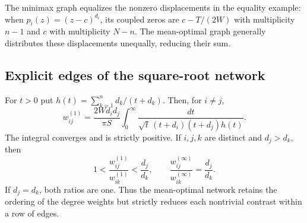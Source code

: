 The minimax graph equalizes the nonzero displacements in the equality
example: when $p_i(z)=(z-c)^{d_i}$, its coupled zeros are $c-T/(2W)$
with multiplicity $n-1$ and $c$ with multiplicity $N-n$. The mean-optimal
graph generally distributes these displacements unequally, reducing their
sum.

\subsection{Explicit edges of the square-root network}

\begin{lemma}\label{net:lem:edges}
For $t>0$ put $h(t)=\sum_{k=1}^n d_k/(t+d_k)$. Then, for $i\ne j$,
\begin{equation}\label{net:eq:integral-edges}
 w^{(1)}_{ij}
 =\frac{2W d_i d_j}{\pi S}
   \int_0^{\infty}
   \frac{dt}{\sqrt t\,(t+d_i)(t+d_j)h(t)}.
\end{equation}
The integral converges and is strictly positive. If $i,j,k$ are distinct
and $d_j>d_k$, then
\begin{equation}\label{net:eq:contrast}
 1<\frac{w^{(1)}_{ij}}{w^{(1)}_{ik}}<\frac{d_j}{d_k},
 \qquad
 \frac{w^{(\infty)}_{ij}}{w^{(\infty)}_{ik}}=\frac{d_j}{d_k}.
\end{equation}
If $d_j=d_k$, both ratios are one. Thus the mean-optimal network retains
the ordering of the degree weights but strictly reduces each nontrivial
contrast within a row of edges.
\end{lemma}

